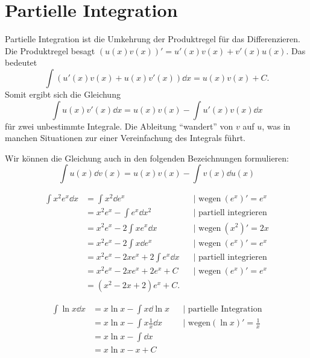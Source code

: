 \section{Partielle Integration} 

\begin{bem}
	Partielle Integration ist die Umkehrung der Produktregel für das Differenzieren. 
	Die Produktregel besagt
	$( u(x) v(x))'= u'(x) v(x) + v'(x) u(x)$. Das bedeutet
	\[
		\int ( u'(x) v(x) + u(x) v'(x)) \dd x = u(x) v(x)+ C.
	\]
	Somit ergibt sich die Gleichung 
	\[
		\int u(x) v'(x) \dd x = u(x) v(x) - \int u'(x) v(x) \dd x
	\]
	 für zwei unbestimmte Integrale. Die Ableitung ``wandert'' von $v$ auf $u$, was in manchen Situationen zur einer Vereinfachung des Integrals führt.  
	 
	 Wir können die Gleichung auch in den folgenden Bezeichnungen formulieren: 
	 \[
	 	\int u(x) \dd v(x) = u(x) v(x) - \int v(x) \dd u(x) 
	 \]
\end{bem} 

\begin{bsp}
	\begin{align*}
		\int x^2 e^x \dd x & = \int  x^2 \dd e^x & & |\text{ wegen} \ (e^x)'= e^x
		\\ & = x^2 e^x  - \int e^x \dd x^2 & & |\text{ partiell integrieren}
		\\ & = x^2 e^x  - 2 \int x e^x \dd x & & |\text{ wegen} \ (x^2)' = 2x
		\\ & = x^2 e^x - 2 \int x \dd e^x & & |\text{ wegen} \ (e^x)' = e^x
		\\ & = x^2 e^x  - 2 x e^x + 2 \int e^x \dd x & &|\text{ partiell integrieren}
		\\ & = x^2 e^x  - 2 x e^x + 2 e^x + C & & |\text{ wegen} \ (e^x)'= e^x
		\\ & = (x^2 - 2 x+ 2) e^x + C.
	\end{align*}
\end{bsp} 

\begin{bsp}
	\begin{align*}
		\int \ln x \dd x & = x \ln x - \int x \dd \ln x & &| \text{\ partielle Integration}
		\\ & = x \ln x - \int x \frac{1}{x} \dd x & &| \text{\ wegen} (\ln x)' = \frac{1}{x}
		\\ & = x \ln x  - \int \dd x 
		\\ & = x \ln x - x + C
	\end{align*} 
\end{bsp} 

